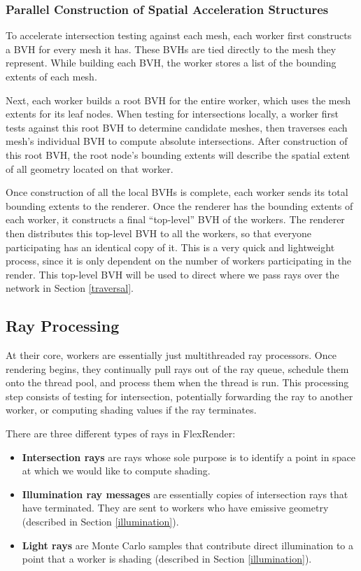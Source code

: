 \documentclass[a4paper,twoside]{article}
\begin{document}
\subsubsection{Parallel Construction of Spatial Acceleration Structures}
\label{parallelbvh}

To accelerate intersection testing against each mesh, each worker first
constructs a BVH for every mesh it has. These BVHs are tied directly to the mesh
they represent. While building each BVH, the worker stores a list of the bounding
extents of each mesh.

Next, each worker builds a root BVH for the entire worker, which uses the mesh
extents for its leaf nodes. When testing for intersections locally, a worker
first tests against this root BVH to determine candidate meshes, then traverses
each mesh's individual BVH to compute absolute intersections. After construction
of this root BVH, the root node's bounding extents will describe the spatial
extent of all geometry located on that worker.

Once construction of all the local BVHs is complete, each worker sends its
total bounding extents to the renderer. Once the renderer has the bounding
extents of each worker, it constructs a final ``top-level'' BVH of the workers.
The renderer then distributes this top-level BVH to all the workers, so that
everyone participating has an identical copy of it. This is a very quick and
lightweight process, since it is only dependent on the number of workers
participating in the render.  This top-level BVH will be used to direct where we pass rays over the network
in Section \ref{traversal}.

\subsection{Ray Processing}
\label{process}

At their core, workers are essentially just multithreaded ray processors. Once
rendering begins, they continually pull rays out of the ray queue, schedule them onto the thread pool, and process them
when the thread is run. This processing step consists of testing for intersection,
potentially forwarding the ray to another worker,
or computing shading values if the ray terminates.

There are three different types of rays in FlexRender:

\begin{itemize}
   \item \textbf{Intersection rays} are rays whose sole purpose is to identify
      a point in space at which we would like to compute shading.
   \item \textbf{Illumination ray messages} are essentially copies of intersection
      rays that have terminated. They are sent to workers who have emissive
      geometry (described in Section \ref{illumination}).
   \item \textbf{Light rays} are Monte Carlo samples that contribute direct
      illumination to a point that a worker is shading (described in Section
      \ref{illumination}).
\end{itemize}
\end{document}
